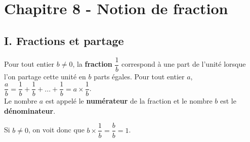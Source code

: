 
\section*{Chapitre 8 - Notion de fraction}

\subsection*{I. Fractions et partage}

\begin{Définitions}
Pour tout entier $b \neq 0$, la \textbf{fraction} $\dfrac{1}{b}$ correspond à une part de l'unité lorsque l'on partage cette unité en $b$ parts égales. Pour tout entier $a$, $\dfrac{a}{b} = \dfrac{1}{b} + \dfrac{1}{b} + ... + \dfrac{1}{b} = a \times \dfrac{1}{b}$. \\

Le nombre $a$ est appelé le \textbf{numérateur} de la fraction et le nombre $b$ est le \textbf{dénominateur}.
\end{Définitions}

\begin{Remarque}
Si $b \neq 0$, on voit donc que $b \times \dfrac{1}{b} = \dfrac{b}{b} = 1$.
\end{Remarque}


